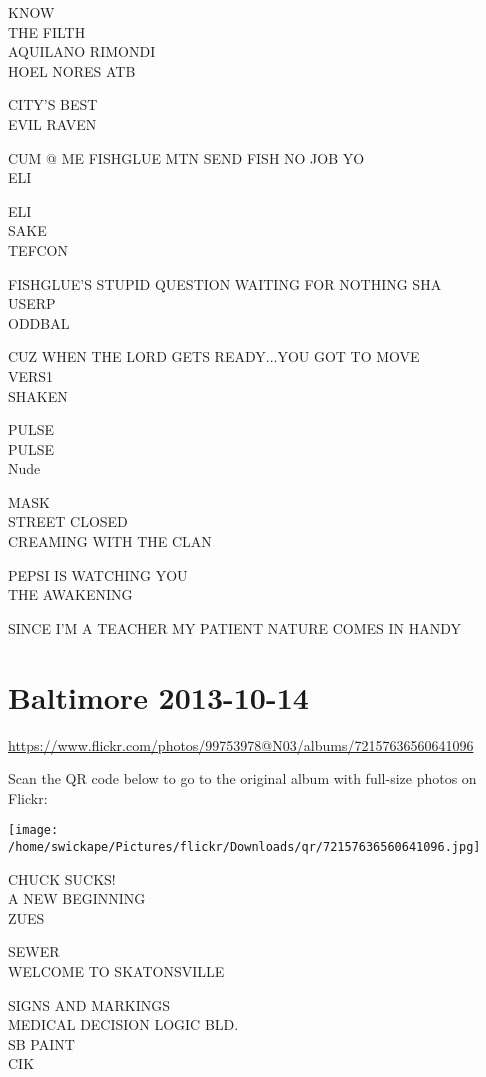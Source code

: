 \documentclass[10pt,letterpaper]{article}
\begin{document}
KNOW\\
THE FILTH\\
AQUILANO RIMONDI\\
HOEL NORES ATB

CITY'S BEST\\
EVIL RAVEN

CUM @ ME FISHGLUE MTN SEND FISH NO JOB YO\\
ELI

ELI\\
SAKE\\
TEFCON

FISHGLUE'S STUPID QUESTION WAITING FOR NOTHING SHA\\
USERP\\
ODDBAL

CUZ WHEN THE LORD GETS READY...YOU GOT TO MOVE\\
VERS1\\
SHAKEN

PULSE\\
PULSE\\
Nude

MASK\\
STREET CLOSED\\
CREAMING WITH THE CLAN

PEPSI IS WATCHING YOU\\
THE AWAKENING

SINCE I'M A TEACHER MY PATIENT NATURE COMES IN HANDY
\pagebreak

\section*{Baltimore 2013-10-14}

\url{https://www.flickr.com/photos/99753978@N03/albums/72157636560641096}

Scan the QR code below to go to the original album with full-size photos on Flickr:

\texttt{[image: /home/swickape/Pictures/flickr/Downloads/qr/72157636560641096.jpg]}
\pagebreak

CHUCK SUCKS!\\
A NEW BEGINNING\\
ZUES

SEWER\\
WELCOME TO SKATONSVILLE

SIGNS AND MARKINGS\\
MEDICAL DECISION LOGIC BLD.\\
SB PAINT\\
CIK
\end{document}
